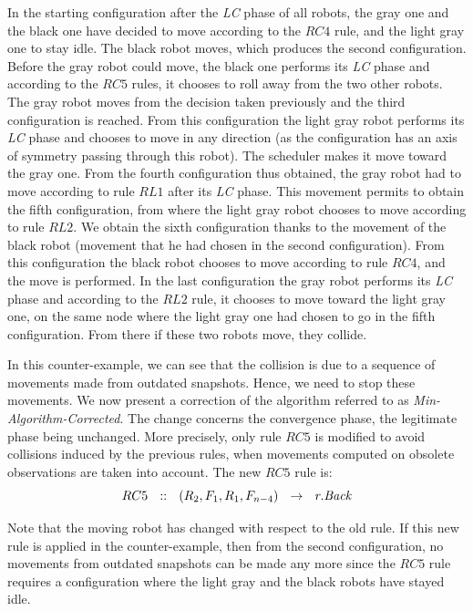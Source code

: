 In the starting configuration after the \textit{LC} phase of all
robots, the gray one and the black one have decided to move according
to the $RC4$ rule, and the light gray one to stay idle.  The black
robot moves, which produces the second configuration. Before the gray
robot could move, the black one performs its \textit{LC} phase and
according to the $RC5$ rules, it chooses to roll away from the two
other robots. The gray robot moves from the decision taken previously
and the third configuration is reached.  From this configuration the
light gray robot performs its \textit{LC} phase and chooses to move in
any direction (as the configuration has an axis of symmetry passing through
this robot). The scheduler makes it move toward the gray one.  From
the fourth configuration thus obtained, the gray robot had to move
according to rule $RL1$ after its \textit{LC} phase.  This movement
permits to obtain the fifth configuration, from where the light gray
robot chooses to move according to rule $RL2$.  We obtain the sixth
configuration thanks to the movement of the black robot (movement that
he had chosen in the second configuration).  From this configuration
the black robot chooses to move according to rule $RC4$, and the move
is performed.  In the last configuration the gray robot performs its
\textit{LC} phase and according to the $RL2$ rule, it chooses to move
toward the light gray one, on the same node where the light gray one
had chosen to go in the fifth configuration.  From there if these two
robots move, they collide.

In this counter-example, we can see that the collision is due to a sequence 
of movements made from outdated snapshots. Hence, we need to stop these 
movements.  We now
present a correction of the algorithm referred to as
\emph{Min-Algorithm-Corrected}. The change concerns the convergence
phase, the legitimate phase being unchanged.  More precisely, only
rule $RC5$ is modified to avoid collisions induced by the previous
rules, when movements computed on obsolete observations are taken into
account. The new $RC5$ rule is: 
$$RC5~~:: ~~(R_2, F_1, R_1, F_{n-4})~~\rightarrow~~r.\textit{Back}$$

Note that the moving robot has changed with respect to the old rule.
If this new rule is applied in the counter-example, then from the second
configuration, no movements from outdated snapshots can be made any
more since the $RC5$ rule requires a configuration where the light
gray and the black robots have stayed idle.

